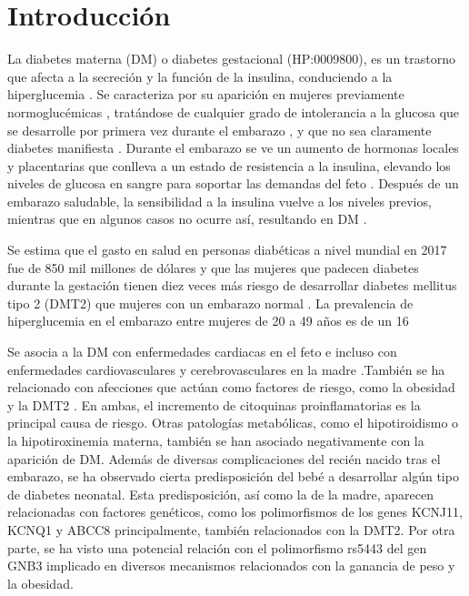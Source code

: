 \section{Introducción}

La diabetes materna (DM) o diabetes gestacional (HP:0009800), es un trastorno que afecta a la secreción y la función de la insulina, conduciendo a la hiperglucemia \cite{Rodolaki2023}. Se caracteriza por su aparición en mujeres previamente normoglucémicas \cite{Rodolaki2023}, tratándose de cualquier grado de intolerancia a la glucosa que se desarrolle por primera vez durante el embarazo \cite{ADB2009}, y que no sea claramente diabetes manifiesta \cite{Grazia2020}. Durante el embarazo se ve un aumento de hormonas locales y placentarias que conlleva a un estado de resistencia a la insulina, elevando los niveles de glucosa en sangre para soportar las demandas del feto \cite{Plows2018}. Después de un embarazo saludable, la sensibilidad a la insulina vuelve a los niveles previos, mientras que en algunos casos no ocurre así, resultando en DM \cite{Plows2018}.


Se estima que el gasto en salud en personas diabéticas a nivel mundial en 2017 fue de 850 mil millones de dólares \cite{Cho2018} y que las mujeres que padecen diabetes durante la gestación tienen diez veces más riesgo de desarrollar diabetes mellitus tipo 2 (DMT2) que mujeres con un embarazo normal \cite{Vounzoulaki2020} \cite{You2021}. La prevalencia de hiperglucemia en el embarazo entre mujeres de 20 a 49 años es de un 16%

Se asocia a la DM con enfermedades cardiacas en el feto \cite{Depla2021} e incluso con enfermedades cardiovasculares y cerebrovasculares en la madre \cite{Xie2022}.También se ha relacionado con afecciones que actúan como factores de riesgo, como la obesidad\cite{Shah2011} y la DMT2 \cite{Haroush2004}. En ambas, el incremento de citoquinas proinflamatorias es la principal causa de riesgo\cite{Pantham2015}. Otras patologías metabólicas, como el hipotiroidismo\cite{Gong2016} o la hipotiroxinemia materna\cite{Topaloglu2022}, también se han asociado negativamente con la aparición de DM.
Además de diversas complicaciones del recién nacido tras el embarazo\cite{Depla2021}\cite{Metzger2010}, se ha observado cierta predisposición del bebé a desarrollar algún tipo de diabetes neonatal\cite{Dabelea2000}. Esta predisposición, así como la de la madre, aparecen relacionadas con factores genéticos, como los polimorfismos de los genes KCNJ11, KCNQ1\cite{Ao2015} y ABCC8 \cite{Piccini2018} principalmente, también relacionados con la DMT2\cite{Khan2020}.
Por otra parte, se ha visto una potencial relación con el polimorfismo rs5443 
del gen GNB3\cite{Feng2019} implicado en diversos mecanismos relacionados con la ganancia de peso y la obesidad\cite{Hsiao2013}. 
